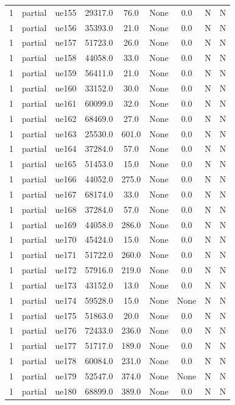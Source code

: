 \begin{table}[ht]
\begin{tabular}{|c|c|c|c|c|c|c|c|c|}
1 & partial & ue155 & 29317.0 & 76.0 & None & 0.0 & N & N \\
1 & partial & ue156 & 35393.0 & 21.0 & None & 0.0 & N & N \\
1 & partial & ue157 & 51723.0 & 26.0 & None & 0.0 & N & N \\
1 & partial & ue158 & 44058.0 & 33.0 & None & 0.0 & N & N \\
1 & partial & ue159 & 56411.0 & 21.0 & None & 0.0 & N & N \\
1 & partial & ue160 & 33152.0 & 30.0 & None & 0.0 & N & N \\
1 & partial & ue161 & 60099.0 & 32.0 & None & 0.0 & N & N \\
1 & partial & ue162 & 68469.0 & 27.0 & None & 0.0 & N & N \\
1 & partial & ue163 & 25530.0 & 601.0 & None & 0.0 & N & N \\
1 & partial & ue164 & 37284.0 & 57.0 & None & 0.0 & N & N \\
1 & partial & ue165 & 51453.0 & 15.0 & None & 0.0 & N & N \\
1 & partial & ue166 & 44052.0 & 275.0 & None & 0.0 & N & N \\
1 & partial & ue167 & 68174.0 & 33.0 & None & 0.0 & N & N \\
1 & partial & ue168 & 37284.0 & 57.0 & None & 0.0 & N & N \\
1 & partial & ue169 & 44058.0 & 286.0 & None & 0.0 & N & N \\
1 & partial & ue170 & 45424.0 & 15.0 & None & 0.0 & N & N \\
1 & partial & ue171 & 51722.0 & 260.0 & None & 0.0 & N & N \\
1 & partial & ue172 & 57916.0 & 219.0 & None & 0.0 & N & N \\
1 & partial & ue173 & 43152.0 & 13.0 & None & 0.0 & N & N \\
1 & partial & ue174 & 59528.0 & 15.0 & None & None & N & N \\
1 & partial & ue175 & 51863.0 & 20.0 & None & 0.0 & N & N \\
1 & partial & ue176 & 72433.0 & 236.0 & None & 0.0 & N & N \\
1 & partial & ue177 & 51717.0 & 189.0 & None & 0.0 & N & N \\
1 & partial & ue178 & 60084.0 & 231.0 & None & 0.0 & N & N \\
1 & partial & ue179 & 52547.0 & 374.0 & None & None & N & N \\
1 & partial & ue180 & 68899.0 & 389.0 & None & 0.0 & N & N \\

\end{tabular}
\end{table}
